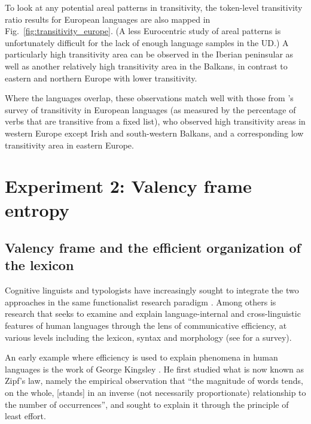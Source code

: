 To look at any potential areal patterns in transitivity, the token-level transitivity ratio results for European languages are also mapped in Fig.~\ref{fig:transitivity_europe}. (A less Eurocentric study of areal patterns is unfortunately difficult for the lack of enough language samples in the UD.) A particularly high transitivity area can be observed in the Iberian peninsular as well as another relatively high transitivity area in the Balkans, in contrast to eastern and northern Europe with lower transitivity.

Where the languages overlap, these observations match well with those from \citet{say2014}'s survey of transitivity in European languages (as measured by the percentage of verbs that are transitive from a fixed list), who observed high transitivity areas in western Europe except Irish and south-western Balkans, and a corresponding low transitivity area in eastern Europe.




\section{Experiment 2: Valency frame entropy}
\subsection{Valency frame and the efficient organization of the lexicon}

Cognitive linguists and typologists have increasingly sought to integrate the two approaches in the same functionalist research paradigm \citep{croft2016}. Among others is research that seeks to examine and explain language-internal and cross-linguistic features of human languages through the lens of communicative efficiency, at various levels including the lexicon, syntax and morphology (see \citealp{gibson2019} for a survey). 

An early example where efficiency is used to explain phenomena in human languages is the work of George Kingsley \citet{zipf1935,zipf1949}. He first studied what is now known as Zipf's law, namely the empirical observation that ``the magnitude of words tends, on the whole, [stands] in an inverse (not necessarily proportionate) relationship to the number of occurrences'', and sought to explain it through the principle of least effort. 

